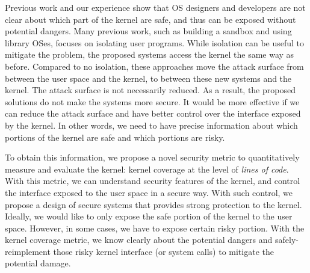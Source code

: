 Previous work and our experience show that OS designers and developers 
are not clear about which part of the kernel are safe, and thus can be 
exposed without potential dangers. 
Many previous work, such as building a sandbox and using library OSes, 
focuses on isolating user programs. While isolation 
can be useful to mitigate the problem, the proposed systems   
access the kernel the same way as before. 
Compared to no isolation, these approaches move
the attack surface from between the user space and the kernel, to 
between these new systems and the kernel. The attack surface
is not necessarily reduced.  
As a result, the proposed solutions do not make the systems more secure. 
%
It would be more effective if we can reduce the attack 
surface and have better control over the interface exposed by the 
kernel. In other words, we need to have precise information about 
which portions of the kernel are safe and which portions are risky.
 
To obtain this information, we propose a novel security metric to 
quantitatively measure and evaluate the kernel: kernel coverage at 
the level of \textit{lines of code}.
%
With this metric, we can understand security features of the kernel, 
and control the interface exposed to the user space in a secure way. 
With such control, we propose a design of secure systems that provides 
strong protection to the kernel. Ideally, we would like to only expose 
the safe portion of the kernel to the user space. However, in some 
cases, we have to expose certain risky portion. With the 
kernel coverage metric, we know clearly about the potential dangers 
and safely-reimplement those risky kernel interface (or system calls) 
to mitigate the potential damage. 

